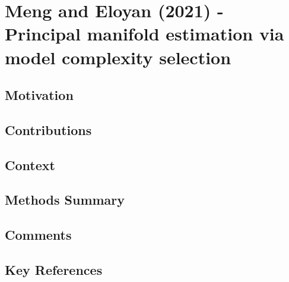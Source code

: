 \section*{Meng and Eloyan (2021) - Principal manifold estimation via model complexity selection}

\subsection*{Motivation}
\subsection*{Contributions}
\subsection*{Context}
\subsection*{Methods Summary}
\subsection*{Comments}
\subsection*{Key References}
